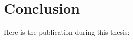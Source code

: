 
\chapter{Conclusion\label{chpt:conclusion}}

Here is the publication during this thesis:

\bigskip{}

\noindent \begin{refsection}[ownpubs]
	\small
	\nocite{*}
	\printbibliography[heading=none]
\end{refsection}
